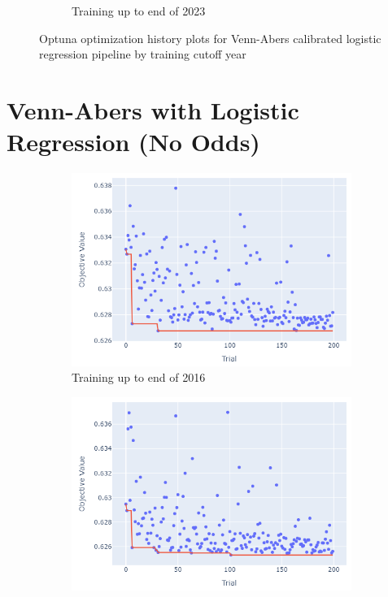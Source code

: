 \documentclass[12pt,twoside]{report}
\begin{document}
\begin{figure}[htb]
\begin{subfigure}{.33\linewidth}
  \caption{Training up to end of 2023}
\end{subfigure}
\par\bigskip
\caption{Optuna optimization history plots for Venn-Abers calibrated logistic regression pipeline by training cutoff year}
\end{figure}

\newpage
\section{Venn-Abers with Logistic Regression (No Odds)}

\begin{figure}[htb]
\centering
\captionsetup{justification=centering}
\begin{subfigure}{.33\linewidth}
  \centering
  \includegraphics[width=0.95\linewidth]{figures/va_lr_no_odds_cutoff_2016.png}
  \caption{Training up to end of 2016}
\end{subfigure}%
\begin{subfigure}{.33\linewidth}
  \centering
  \includegraphics[width=0.95\linewidth]{figures/va_lr_no_odds_cutoff_2017.png}

\end{subfigure}
\end{figure}
\end{document}
